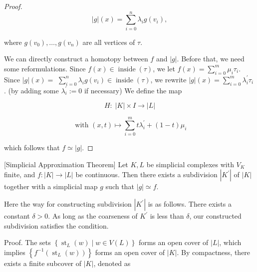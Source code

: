 \begin{proof}
\[
\left| g\right| \left( x\right)  = \mathop{\sum }\limits_{{i = 0}}^{n}{\lambda }_{i}g\left( {v}_{i}\right), 
\]

where \(g\left( {v}_{0}\right), \ldots, g\left( {v}_{n}\right)\) are all vertices of \(\tau\).

We can directly construct a homotopy between \(f\) and \(\left| g\right|\). Before that, we need some reformulations. Since \(f\left( x\right)  \in  \operatorname{inside}\left( \tau \right)\), we let \(f\left( x\right)  = \mathop{\sum }\limits_{{i = 0}}^{m}{\mu }_{i}{\tau }_{i}\). Since \(\left| g\right| \left( x\right)  =\)  \(\mathop{\sum }\limits_{{i = 0}}^{n}{\lambda }_{i}g\left( {v}_{i}\right)  \in  \operatorname{inside}\left( \tau \right)\), we rewrite \(\left| g\right| \left( x\right)  = \mathop{\sum }\limits_{{i = 0}}^{m}{\lambda }_{i}^{\prime }{\tau }_{i}\). (by adding some \({\lambda }_{i}^{\prime } \mathrel{\text{ := }} 0\) if necessary) We define the map

\[
H : \;\left| K\right|  \times  I \rightarrow  \left| L\right|
\]

\[
\text{ with }\left( {x, t}\right)  \mapsto  \mathop{\sum }\limits_{{i = 0}}^{m}t{\lambda }_{i}^{\prime } + \left( {1 - t}\right) {\mu }_{i}
\]

which follows that \(f \simeq  \left| g\right|\).
\end{proof}

\begin{theorem} \label{thm:simplicial_approx}[Simplicial Approximation Theorem] Let \(K, L\) be simplicial complexes with \({V}_{K}\) finite, and \(f : \left| K\right|  \rightarrow  \left| L\right|\) be continuous. Then there exists a subdivision \(\left| {K}^{\prime }\right|\) of \(\left| K\right|\) together with a simplicial map \(g\) such that \(\left| g\right|  \simeq  f\).

Here the way for constructing subdivision \(\left| {K}^{\prime }\right|\) is as follows. There exists a constant \(\delta  > 0\). As long as the coarseness of \({K}^{\prime }\) is less than \(\delta\), our constructed subdivision satisfies the condition.
\end{theorem}


Proof. The sets \(\left\{  {{\operatorname{st}}_{L}\left( w\right)  \mid  w \in  V\left( L\right) }\right\}\) forms an open cover of \(\left| L\right|\), which implies \(\left\{  {{f}^{-1}\left( {{\operatorname{st}}_{L}\left( w\right) }\right) }\right\}\) forms an open cover of \(\left| K\right|\). By compactness, there exists a finite subcover of \(\left| K\right|\), denoted as

